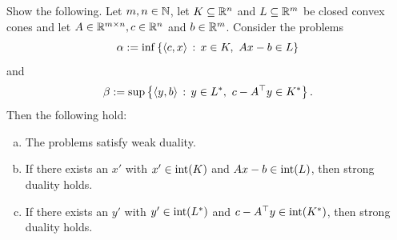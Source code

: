 \begin{exercise}
	Show the following. Let $m, n \in \mathbb{N}$, let $K \subseteq \mathbb{R}^n$ and $L \subseteq \mathbb{R}^m$ be closed convex cones and let $A \in \mathbb{R}^{m \times n}, c \in \mathbb{R}^n$ and $b \in \mathbb{R}^m$. Consider the problems
	\begin{equation}
		\label{eq:primal:K:L}
	\alpha := \inf \left\{  \left\langle c , x \right\rangle  \,:\, x \in K, \ A x - b \in L \right\}
	\end{equation}
	and
	\begin{equation}
		\label{eq:dual:K:L}
	\beta := \sup \left\{  \left\langle y , b \right\rangle \,:\, y \in L^\ast, \ c - A^\top y \in K^\ast \right\}.
	\end{equation}
	Then the following hold:
	\begin{enumerate}[(a)]
		\item The problems satisfy weak duality. 
		\item If there exists an $x'$ with $x' \in \operatorname{int}(K)$ and $A x - b \in \operatorname{int}(L)$, then strong duality holds.
		\item If there exists an $y'$ with $y' \in \operatorname{int}(L^\ast)$ and $c - A^\top y \in \operatorname{int}(K^\ast)$, then strong duality holds.
	\end{enumerate}
\end{exercise}
